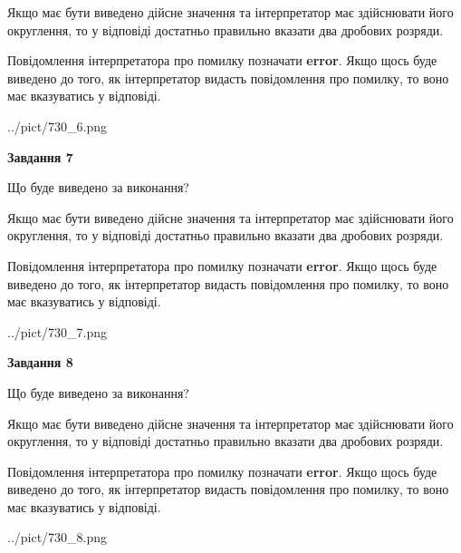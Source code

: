 \documentclass[12pt, ukrainian]{article}
\begin{document}
{\begin {Large}
Якщо має бути виведено дійсне значення та інтерпретатор має здійснювати його округлення, 
то у відповіді достатньо правильно вказати два дробових розряди.

Повідомлення інтерпретатора про помилку позначати \textbf{error}.
Якщо щось буде виведено до того, як інтерпретатор видасть повідомлення про помилку, 
то воно має вказуватись у відповіді. \par

\begin{center}
	{../pict/730_6.png}
\end{center}
\newpage

{\begin {center}\textbf{Завдання 7}\end {center}}\par
Що буде виведено за виконання? \par

Якщо має бути виведено дійсне значення та інтерпретатор має здійснювати його округлення, 
то у відповіді достатньо правильно вказати два дробових розряди.

Повідомлення інтерпретатора про помилку позначати \textbf{error}.
Якщо щось буде виведено до того, як інтерпретатор видасть повідомлення про помилку, 
то воно має вказуватись у відповіді. \par

\begin{center}
	{../pict/730_7.png}
\end{center}
\newpage

{\begin {center}\textbf{Завдання 8}\end {center}}\par
Що буде виведено за виконання? \par

Якщо має бути виведено дійсне значення та інтерпретатор має здійснювати його округлення, 
то у відповіді достатньо правильно вказати два дробових розряди.

Повідомлення інтерпретатора про помилку позначати \textbf{error}.
Якщо щось буде виведено до того, як інтерпретатор видасть повідомлення про помилку, 
то воно має вказуватись у відповіді. \par

\begin{center}
	{../pict/730_8.png}
\end{center}
\newpage


\end{Large}}
\end{document}
